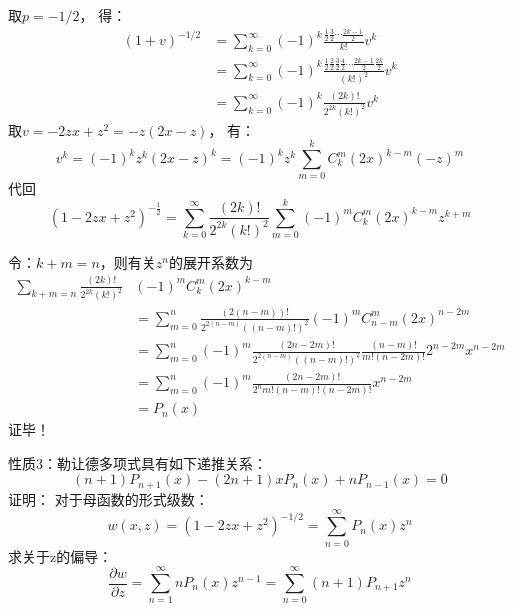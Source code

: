 \begin{frame}
	取$p=-1/2$， 得：
	\begin{align*}
		(1+v)^{-1/2}&=\sum_{k=0}^{\infty} (-1)^{k}\frac{\frac{1}{2}\frac{3}{2}  \cdots \frac{2k-1}{2}}{k !} v^{k}\\
		&=\sum_{k=0}^{\infty} (-1)^{k}\frac{\frac{1}{2}\frac{2}{2}\frac{3}{2} \frac{4}{2}  \cdots \frac{2k-1}{2}\frac{2k}{2}} {(k !)^2} v^{k}\\
		&=\sum_{k=0}^{\infty}(-1)^{k} \frac{(2 k) !}{2^{2 k}(k !)^{2}} v^{k}
	\end{align*}	
	取$v=-2zx+z^2=-z(2x-z)$， 有：
	\begin{equation*}
		v^{k}=(-1)^{k} z^{k}(2 x-z)^{k}=(-1)^{k} z^{k} \sum_{m=0}^{k} C_{k}^{m}(2 x)^{k-m}(-z)^{m}
	\end{equation*}	
	代回
	\begin{equation*}
		\left(1-2 z x+z^{2}\right)^{-\frac{1}{2}}=\sum_{k=0}^{\infty} \frac{(2 k) !}{2^{2 k}(k !)^{2}} \sum_{m=0}^{k}(-1)^{m} C_{k}^{m}(2 x)^{k-m} z^{k+m}
	\end{equation*}	
\end{frame}	

\begin{frame}
	令：$k+m=n$，则有关$z^{n}$的展开系数为
	\begin{equation*}
	\begin{split}
		\sum_{k+m=n}\frac{(2 k) !}{2^{2 k}(k !)^{2}} & (-1)^{m} C_{k}^{m}(2 x)^{k-m}\\
		&=\sum_{m=0}^{n} \frac{(2 (n-m)) !}{2^{2 (n-m)}((n-m) !)^{2}}(-1)^{m} C_{n-m}^{m}(2 x)^{n-2m}\\
		&=\sum_{m=0}^{n}(-1)^{m} \frac{(2 n-2m) !}{2^{2 (n-m)}((n-m) !)^{2}} \frac{(n-m) !}{m!(n-2 m) !}2^{n-2 m}x^{n-2 m}\\
		&=\sum_{m=0}^{n}(-1)^{m} \frac{(2 n-2 m) !}{2^{n} m !(n-m) !(n-2 m) !} x^{n-2 m} \\
		&=P_{n}(x)
	\end{split}
	\end{equation*}	
	\alert{证毕！}
\end{frame}	

\begin{frame}
	\alert{性质3：}勒让德多项式具有如下递推关系：
	\begin{equation*}
		(n+1) P_{n+1}(x)-(2 n+1) x P_{n}(x)+n P_{n-1}(x)=0
	\end{equation*}	
	\alert{证明：} 对于母函数的形式级数：
	\begin{equation*}
		w(x, z)=(1-2zx+z^2)^{-1/2}=\sum_{n=0}^{\infty} P_{n}(x) z^{n}
	\end{equation*}	
	求关于z的偏导：
	\begin{equation*}
		\frac{\partial w}{\partial z}=\sum_{n=1}^{\infty} n P_{n}(x) z^{n-1}=\sum_{n=0}^{\infty}(n+1) P_{n+1} z^{n}
	\end{equation*}		
\end{frame}	

